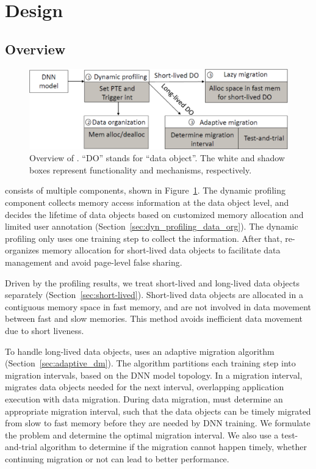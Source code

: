\section{Design}
\subsection{Overview}
\begin{figure}[t!]
	\centering
	\includegraphics[height=0.11\textheight]{./figures/overview-2.pdf}
	\vspace{-5pt}
	\caption{Overview of \name. ``DO'' stands for ``data object''.  The white and shadow boxes represent functionality and mechanisms, respectively.} 
	\vspace{-15pt}
	\centering
	\label{fig:overview} 
\end{figure}



\name consists  of multiple components, shown in Figure~\ref{fig:overview}. The dynamic profiling component collects memory access information at the data object level, and decides the lifetime of data objects based on customized memory allocation
and limited user annotation   \textcolor{dong2}{(Section~\ref{sec:dyn_profiling_data_org})}. The dynamic profiling only uses one training step to collect the information. After that, \name re-organizes memory allocation for short-lived data objects to facilitate data management and avoid page-level false sharing.

Driven by the profiling results, we treat short-lived and long-lived data objects separately   \textcolor{dong2}{(Section~\ref{sec:short-lived})}. Short-lived data objects are allocated in a contiguous memory space in fast memory, and are not involved in data movement between fast and slow memories. This method avoids inefficient data movement due to short liveness. 

To handle long-lived data objects, \name uses an adaptive migration algorithm  \textcolor{dong2}{(Section~\ref{sec:adaptive_dm})}. The algorithm partitions each training step into migration intervals, based on the DNN model topology. In a migration interval, \name migrates data objects needed for the next interval, overlapping application execution with data migration. During data migration, \name must determine an appropriate migration interval, such that the data objects can be timely migrated from slow to fast memory before they are needed by DNN training. We formulate the problem and determine the optimal migration interval. We also use a test-and-trial algorithm to determine if the migration cannot happen timely, whether continuing migration or not can lead to better performance. 


